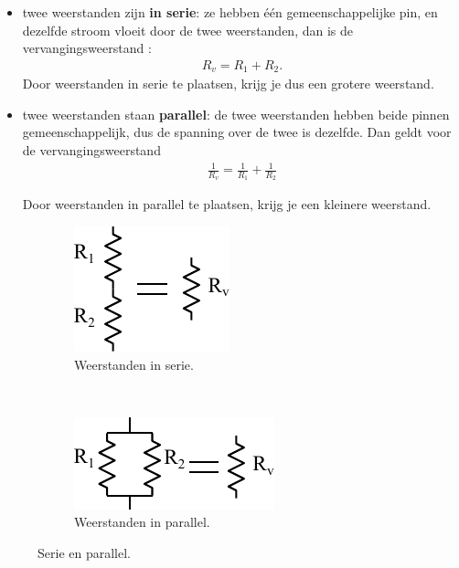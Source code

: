 \documentclass{article}
\begin{document}
			\begin{itemize}
				\item twee weerstanden zijn \textbf{in serie}: ze hebben \'e\'en gemeenschappelijke pin, en dezelfde stroom vloeit door de twee weerstanden, dan is de vervangingsweerstand :
				\begin{align}
					R_{v} = R_1 + R_2.
				\end{align}
				Door weerstanden in serie te plaatsen, krijg je dus een grotere weerstand.

				\item twee weerstanden staan \textbf{parallel}: de twee weerstanden hebben beide pinnen gemeenschappelijk, dus de spanning over de twee is dezelfde. Dan geldt voor de vervangingsweerstand 
				\begin{align}
					\frac{1}{R_{v}}= \frac{1}{R_{1}} + \frac{1}{R_{2}} 
				\end{align}

				Door weerstanden in parallel te plaatsen, krijg je een kleinere weerstand.
			\end{itemize}

			\begin{figure}[hbtp]
				\centering
				\begin{subfigure}[b]{0.45\linewidth}
					\centering
					\includegraphics{serie}
					\caption{Weerstanden in serie.}
					\label{subfig:serie}
				\end{subfigure}
				~
				\begin{subfigure}[b]{0.45\linewidth}
					\centering
					\includegraphics{parallel}
					\caption{Weerstanden in parallel.}
					\label{subfig:parallel}
				\end{subfigure}
				\caption{Serie en parallel.}
				\label{fig:serie_en_parallel}
			\end{figure}
\end{document}
